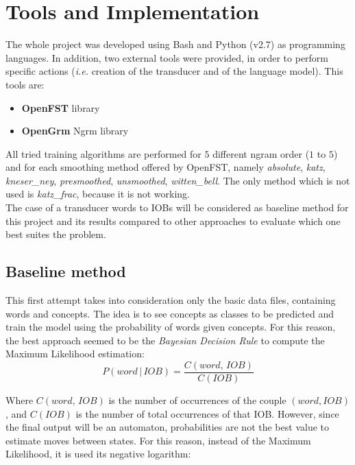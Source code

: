 \documentclass[11pt,a4paper]{article}
\begin{document}
\section{Tools and Implementation}

The whole project was developed using Bash and Python (v2.7) as programming languages. In addition, two external tools were provided, in order to perform specific actions (\textit{i.e.} creation of the transducer and of the language model). This tools are:
\begin{itemize}
	\item \textbf{OpenFST} library \cite{fst}
	\item \textbf{OpenGrm} Ngrm library \cite{ngr}
\end{itemize}

All tried training algorithms are performed for $5$ different ngram order ($1$ to $5$) and for each smoothing method offered by OpenFST, namely \textit{absolute}, \textit{katz}, \textit{kneser\_ney}, \textit{presmoothed}, \textit{unsmoothed}, \textit{witten\_bell}. The only method which is not used is \textit{katz\_frac}, because it is not working.\\

The case of a transducer words to IOBs will be considered as baseline method for this project and its results compared to other approaches to evaluate which one best suites the problem.

\subsection{Baseline method}

This first attempt takes into consideration only the basic data files, containing words and concepts. The idea is to see concepts as classes to be predicted and train the model using the probability of words given concepts. For this reason, the best approach seemed to be the \textit{Bayesian Decision Rule} to compute the Maximum Likelihood estimation:
\begin{equation}
\label{probw2iob}
	P(word\,|\,IOB)=\frac{C(word,\,IOB)}{C(IOB)}
\end{equation}
	
	Where $C(word,\,IOB)$ is the number of occurrences of the couple $(word, IOB)$, and $C(IOB)$ is the number of total occurrences of that IOB. However, since the final output will be an automaton, probabilities are not the best value to estimate moves between states. For this reason, instead of the Maximum Likelihood, it is used its negative logarithm:
	
\end{document}
